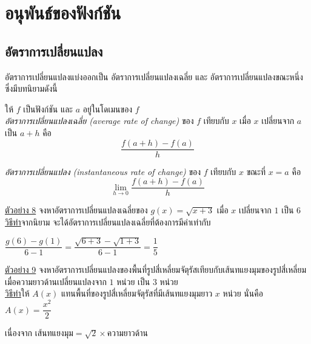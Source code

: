 \documentclass[hidelinks,12pt,a4paper]{article}
\newcommand{\s}{\space}
\newcommand{\qed}{\scalebox{0.8}{$\blacksquare$}}
\begin{document}
\newpage
\section{อนุพันธ์ของฟังก์ชัน}
\subsection{อัตราการเปลี่ยนแปลง}
อัตราการเปลี่ยนแปลงแบ่งออกเป็น อัตราการเปลี่ยนแปลงเฉลี่ย และ อัตราการเปลี่ยนแปลงขณะหนึ่ง ซึ่งมีบทนิยามดังนี้

\begin{tcolorbox}[title=\textbf{บทนิยาม}]
    ให้ $f$ เป็นฟังก์ชัน และ $a$ อยู่ในโดเมนของ $f$ \\
    \emph{อัตราการเปลี่ยนแปลงเฉลี่ย (average rate of change)} ของ $f$ เทียบกับ $x$ เมื่อ $x$ เปลี่ยนจาก $a$ เป็น $a+h$ คือ
    \begin{equation*}
        \frac{f(a+h)-f(a)}{h}
    \end{equation*}
    
    \emph{อัตราการเปลี่ยนแปลง (instantaneous rate of change)} ของ $f$ เทียบกับ $x$ ขณะที่ $x=a$ คือ
    \begin{equation*}
        \lim_{h\to0} \frac{f(a+h)-f(a)}{h}
    \end{equation*}
\end{tcolorbox}

\vspace{2mm}
\underline{ตัวอย่าง 8} จงหาอัตราการเปลี่ยนแปลงเฉลี่ยของ $g(x)=\sqrt{x+3}$ เมื่อ $x$ เปลี่ยนจาก $1$ เป็น $6$ \\[1ex]
\underline{\underline{วิธีทำ}}\hspace{8mm}จากนิยาม จะได้อัตราการเปลี่ยนแปลงเฉลี่ยที่ต้องการมีค่าเท่ากับ 

\vspace{1mm}
\hspace{15mm} $\dfrac{g(6)-g(1)}{6-1}=\dfrac{\sqrt{6+3}-\sqrt{1+3}}{6-1} = \dfrac{1}{5}$ \hfill \qed

\vspace{5mm}
\underline{ตัวอย่าง 9} จงหาอัตราการเปลี่ยนแปลงของพื้นที่รูปสี่เหลี่ยมจัตุรัสเทียบกับเส้นทแยงมุมของรูปสี่เหลี่ยม เมื่อความยาวด้านเปลี่ยนแปลงจาก $1$ หน่วย เป็น $3$ หน่วย \\[1ex]
\underline{\underline{วิธีทำ}}\hspace{8mm}ให้ $A(x)$ แทนพื้นที่ของรูปสี่เหลี่ยมจัตุรัสที่มีเส้นทแยงมุมยาว $x$ หน่วย \s นั่นคือ $A(x)=\dfrac{x^2}{2}$

\hspace{15mm} เนื่องจาก เส้นทแยงมุม$=\sqrt{2}\times$ความยาวด้าน
\end{document}
